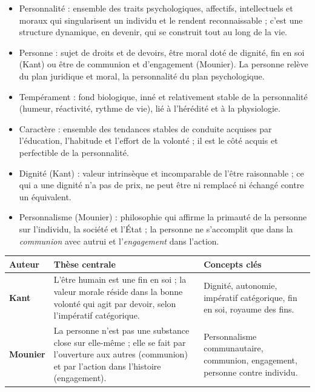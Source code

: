 \documentclass[11pt]{article}
\newcommand{\cle}[1]{{\popxbold\color{popdark}#1}}
\begin{document}
\begin{aretenir}
\begin{itemize}
  \item \cle{Personnalité} : ensemble des traits psychologiques, affectifs, intellectuels et moraux qui singularisent un individu et le rendent reconnaissable ; c'est une structure dynamique, en devenir, qui se construit tout au long de la vie.
  \item \cle{Personne} : sujet de droits et de devoirs, être moral doté de dignité, fin en soi (Kant) ou être de communion et d'engagement (Mounier). La personne relève du plan juridique et moral, la personnalité du plan psychologique.
  \item \cle{Tempérament} : fond biologique, inné et relativement stable de la personnalité (humeur, réactivité, rythme de vie), lié à l'hérédité et à la physiologie.
  \item \cle{Caractère} : ensemble des tendances stables de conduite acquises par l'éducation, l'habitude et l'effort de la volonté ; il est le côté acquis et perfectible de la personnalité.
  \item \cle{Dignité} (Kant) : valeur intrinsèque et incomparable de l'être raisonnable ; ce qui a une dignité n'a pas de prix, ne peut être ni remplacé ni échangé contre un équivalent.
  \item \cle{Personnalisme} (Mounier) : philosophie qui affirme la primauté de la personne sur l'individu, la société et l'État ; la personne ne s'accomplit que dans la \emph{communion} avec autrui et l'\emph{engagement} dans l'action.
\end{itemize}
\end{aretenir}

\begin{aretenir}
\begin{center}
\begin{tabularx}{\linewidth}{|>{\bfseries}l|X|X|}\hline
\rowcolor{popblueL}\textbf{Auteur} & \textbf{Thèse centrale} & \textbf{Concepts clés} \\\hline
Kant & L'être humain est une fin en soi ; la valeur morale réside dans la \cle{bonne volonté} qui agit par \cle{devoir}, selon l'impératif catégorique. & Dignité, autonomie, impératif catégorique, fin en soi, royaume des fins. \\\hline
Mounier & La personne n'est pas une substance close sur elle-même ; elle \cle{se fait} par l'ouverture aux autres (\cle{communion}) et par l'action dans l'histoire (\cle{engagement}). & Personnalisme communautaire, communion, engagement, personne contre individu. \\\hline
\end{tabularx}
\end{center}
\end{aretenir}
\end{document}
